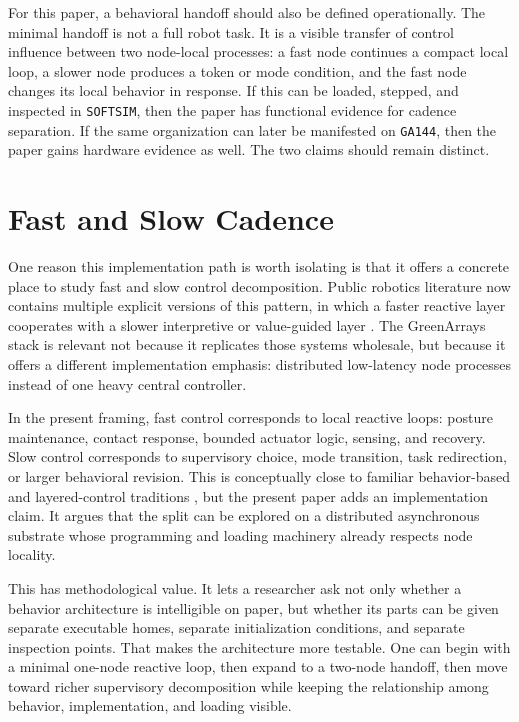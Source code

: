 \documentclass[11pt]{article}
\begin{document}
For this paper, a behavioral handoff should also be defined operationally.
The minimal handoff is not a full robot task. It is a visible transfer of
control influence between two node-local processes: a fast node continues a
compact local loop, a slower node produces a token or mode condition, and
the fast node changes its local behavior in response. If this can be loaded,
stepped, and inspected in \texttt{SOFTSIM}, then the paper has functional
evidence for cadence separation. If the same organization can later be
manifested on \texttt{GA144}, then the paper gains hardware evidence as
well. The two claims should remain distinct.

\section{Fast and Slow Cadence}

One reason this implementation path is worth isolating is that it offers a
concrete place to study fast and slow control decomposition. Public robotics
literature now contains multiple explicit versions of this pattern, in which
a faster reactive layer cooperates with a slower interpretive or
value-guided layer \citep{wang2025hume}. The GreenArrays stack is relevant
not because it replicates those systems wholesale, but because it offers a
different implementation emphasis: distributed low-latency node processes
instead of one heavy central controller.

In the present framing, fast control corresponds to local reactive loops:
posture maintenance, contact response, bounded actuator logic, sensing, and
recovery. Slow control corresponds to supervisory choice, mode transition,
task redirection, or larger behavioral revision. This is conceptually close
to familiar behavior-based and layered-control traditions
\citep{arkin1998behavior,brooks1991intelligence}, but the present paper adds
an implementation claim. It argues that the split can be explored on a
distributed asynchronous substrate whose programming and loading machinery
already respects node locality.

This has methodological value. It lets a researcher ask not only whether a
behavior architecture is intelligible on paper, but whether its parts can be
given separate executable homes, separate initialization conditions, and
separate inspection points. That makes the architecture more testable. One
can begin with a minimal one-node reactive loop, then expand to a two-node
handoff, then move toward richer supervisory decomposition while keeping the
relationship among behavior, implementation, and loading visible.
\end{document}
